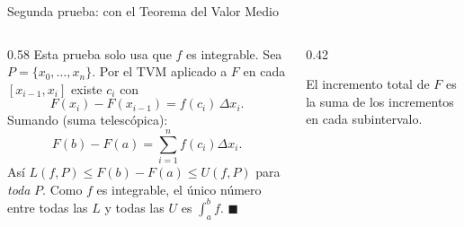 \documentclass[10pt,aspectratio=169]{beamer}
\begin{document}
\begin{frame}{Segunda prueba: con el Teorema del Valor Medio}
  \begin{columns}
    \begin{column}{0.58\textwidth}
      Esta prueba solo usa que $f$ es integrable. Sea $P=\{x_0,\dots,x_n\}$. Por el TVM aplicado a $F$
      en cada $[x_{i-1},x_i]$ existe $c_i$ con
      \[ F(x_i)-F(x_{i-1})=f(c_i)\,\Delta x_i. \]
      Sumando (suma telescópica):
      \[ F(b)-F(a)=\sum_{i=1}^nf(c_i)\Delta x_i. \]
      Así $L(f,P)\le F(b)-F(a)\le U(f,P)$ para \emph{toda} $P$. Como $f$ es integrable, el único número
      entre todas las $L$ y todas las $U$ es $\int_a^bf$. $\blacksquare$
    \end{column}
    \begin{column}{0.42\textwidth}
      \centering

      \small El incremento total de $F$ es la suma de los incrementos en cada subintervalo.
    \end{column}
  \end{columns}
\end{frame}
\end{document}
